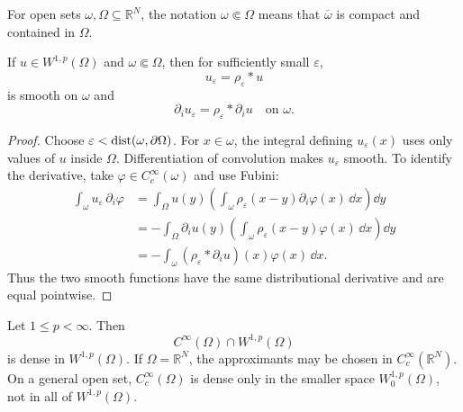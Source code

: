 \begin{notedefinition}
For open sets $\omega,\Omega\subseteq\mathbb R^N$, the notation
$\omega\Subset\Omega$ means that $\overline\omega$ is compact and contained
in $\Omega$.
\end{notedefinition}

\begin{notelemma}
If $u\in W^{1,p}(\Omega)$ and $\omega\Subset\Omega$, then for sufficiently
small $\varepsilon$,
\[
  u_\varepsilon=\rho_\varepsilon*u
\]
is smooth on $\omega$ and
\[
  \partial_i u_\varepsilon
  =\rho_\varepsilon*\partial_i u
  \quad\text{on }\omega.
\]
\end{notelemma}

\begin{proof}
Choose $\varepsilon<\operatorname{dist}(\omega,\partial\Omega)$.  For $x\in\omega$, the
integral defining $u_\varepsilon(x)$ uses only values of $u$ inside $\Omega$.
Differentiation of convolution makes $u_\varepsilon$ smooth.  To identify the
derivative, take $\varphi\in C_c^\infty(\omega)$ and use Fubini:
\[
\begin{aligned}
  \int_\omega u_\varepsilon\,\partial_i\varphi
   &=\int_\Omega u(y)
      \left(\int_\omega\rho_\varepsilon(x-y)
                    \partial_i\varphi(x)\,\dd x\right)\dd y\\
   &=-\int_\Omega \partial_i u(y)
      \left(\int_\omega\rho_\varepsilon(x-y)
                    \varphi(x)\,\dd x\right)\dd y\\
   &=-\int_\omega(\rho_\varepsilon*\partial_i u)(x)
                    \varphi(x)\,\dd x.
\end{aligned}
\]
Thus the two smooth functions have the same distributional derivative and are
equal pointwise.
\end{proof}

\begin{notetheorem}
Let $1\le p<\infty$.  Then
\[
  C^\infty(\Omega)\cap W^{1,p}(\Omega)
\]
is dense in $W^{1,p}(\Omega)$.  If $\Omega=\mathbb R^N$, the approximants may
be chosen in $C_c^\infty(\mathbb R^N)$.  On a general open set,
$C_c^\infty(\Omega)$ is dense only in the smaller space
$W_0^{1,p}(\Omega)$, not in all of $W^{1,p}(\Omega)$.
\end{notetheorem}

